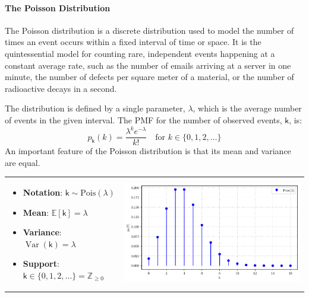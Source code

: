 \paragraph*{The Poisson Distribution}
The Poisson distribution is a discrete distribution used to model the number of times an event occurs within a fixed interval of time or space. It is the quintessential model for counting rare, independent events happening at a constant average rate, such as the number of emails arriving at a server in one minute, the number of defects per square meter of a material, or the number of radioactive decays in a second. 

The distribution is defined by a single parameter, $\lambda$, which is the average number of events in the given interval. The PMF for the number of observed events, $\mathsf{k}$, is:
\begin{equation}
    p_{\mathsf{k}}(k) = \frac{\lambda^k e^{-\lambda}}{k!} \quad \text{for } k \in \{0, 1, 2, \dots\}
\end{equation}
An important feature of the Poisson distribution is that its mean and variance are equal.

\begin{tabular}{@{}>{\raggedright\arraybackslash}m{} >{\raggedleft\arraybackslash}m{}@{}}
    \begin{itemize}
        \item \textbf{Notation}: $\mathsf{k} \sim \mathrm{Pois}(\lambda)$
        \item \textbf{Mean}: $\mathbb{E}[\mathsf{k}] = \lambda$
        \item \textbf{Variance}: $\operatorname{Var}(\mathsf{k}) = \lambda$
        \item \textbf{Support}: $\mathsf{k} \in \{0, 1, 2, \dots\} = \mathbb{Z}_{\ge 0}$
    \end{itemize}
    &
    \includegraphics[width=\linewidth]{figs/probability/poisson_pmf.pdf} \\
\end{tabular}

